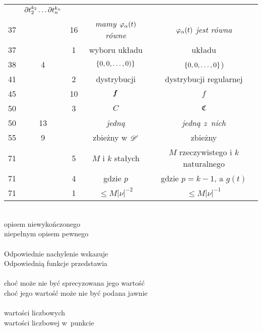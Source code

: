 \documentclass[a4paper,11pt]{article}
\begin{document}
\begin{center}
\begin{tabular}{|c|c|c|c|c|}
           & $\partial t_{ 2 }^{ k_{ 2 } } \ldots \partial t_{ n }^{ k_{ n } }$ \\
    37 & & 16 & \emph{mamy $\varphi_{ \alpha }( t )$ równe}
           & \emph{$\varphi_{ \alpha }( t )$ jest równa} \\
    37 & & 1 & wyboru układu & układu \\
    38 & 4 & & $\{ 0, 0, \ldots, 0 ) \}$ & $\{ 0, 0, \ldots, 0 \}$) \\
    41 & & 2 & dystrybucji & dystrybucji regularnej \\
    45 & & 10 & $\boldsymbol{f}$ & $f$ \\
    50 & & 3 & $C$ & $\mathfrak{C}$ \\
    50 & 13 & & \emph{jedną} & \emph{jedną z~nich} \\
    55 & 9 & & zbieżny w $\mathcal{D}'$ & zbieżny \\
    71 & & 5 & $M$ i $k$ stałych & $M$ rzeczywistego i $k$ naturalnego \\
    71 & & 4 & gdzie $p$ & gdzie $p = k - 1$, a $g( t )$\\
    71 & & 1 & $\leq M | \nu |^{ -2 }$ & $\leq M | \nu |^{ -1 }$\\
    \hline
  \end{tabular}
\end{center}
\noi
{} \\
\Jest opisem niewykończonego \\
\Pow niepełnym opisem pewnego \\
 \\
\Jest Odpowiednie nachylenie wskazuje \\
\Pow Odpowiednią funkcje przedstawia \\
 \\
\Jest choć może nie być sprecyzowana jego wartość \\
\Pow choć jego wartość może nie być podana jawnie \\
 \\
\Jest wartości liczbowych \\
\Pow wartości liczbowej w~punkcie \\




 {}



\end{document}
